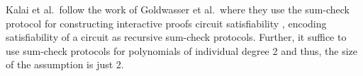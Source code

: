 Kalai et al.~follow the work of Goldwasser et al.~where they use the sum-check protocol for constructing interactive proofs circuit satisfiability \cite{STOC:GolKalRot08}, encoding satisfiability of a circuit as recursive sum-check protocols. Further, it suffice to use sum-check protocols for polynomials of individual degree 2 and thus, the size of the assumption is just 2. 

